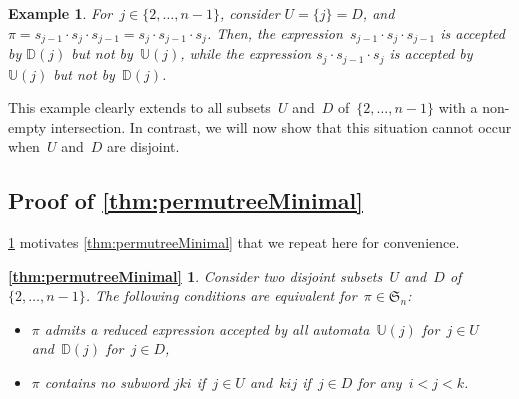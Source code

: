 \documentclass{amsart}
\newtheorem{example}[theorem]{Example}
\newcommand{\fS}{\mathfrak{S}} %
\newcommand{\automatonU}{\mathbb{U}} %
\newcommand{\automatonD}{\mathbb{D}} %
\begin{document}
\begin{example}\label{exm:problemUDintersect}
For~$j \in \{2, \dots, n-1\}$, consider $U = \{j\} = D$, and~$\pi = s_{j-1} \cdot s_j \cdot s_{j-1} = s_j \cdot s_{j-1} \cdot s_j$.
Then, the expression~$s_{j-1} \cdot s_j \cdot s_{j-1}$ is accepted by $\automatonD(j)$ but not by~$\automatonU(j)$, while the expression $s_j \cdot s_{j-1} \cdot s_j$ is accepted by $\automatonU(j)$ but not by~$\automatonD(j)$.
\end{example}

This example clearly extends to all subsets~$U$ and~$D$ of~$\{2, \dots, n-1\}$ with a non-empty intersection.
In contrast, we will now show that this situation cannot occur when~$U$ and~$D$ are disjoint.

\subsection{Proof of \cref{thm:permutreeMinimal}}

\cref{exm:problemUDintersect} motivates \cref{thm:permutreeMinimal} that we repeat here for convenience.

\newtheorem*{thm:permutreeMinimal}{\cref{thm:permutreeMinimal}}
\begin{thm:permutreeMinimal}
Consider two disjoint subsets~$U$ and~$D$ of~$\{2, \dots, n-1\}$.
The following conditions are equivalent for~$\pi \in \fS_n$:
\begin{itemize}
\item $\pi$ admits a reduced expression accepted by all automata~$\automatonU(j)$ for~$j \in U$ and~$\automatonD(j)$ for~${j \in D}$,
\item $\pi$ contains no subword $jki$ if~$j \in U$ and~$kij$ if~$j \in D$ for any~$i < j < k$.
\end{itemize}
\end{thm:permutreeMinimal}
\end{document}

